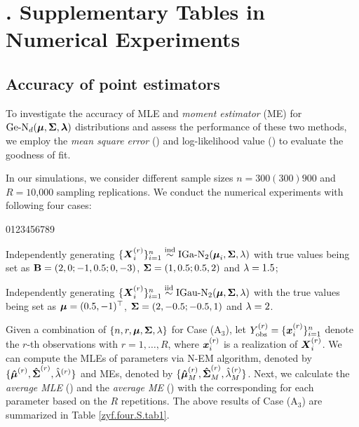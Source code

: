 \section{$\!\!\!\!\!\!\!$. Supplementary Tables in Numerical Experiments}        %

\subsection{Accuracy of point estimators}       %

To investigate the accuracy of MLE and \textit{moment estimator} (ME) for $\mbox{Ge-N}_d({\boldsymbol{\mu}}, {\mbox{\boldmath$\Sigma$}}, {\boldsymbol{\lambda}})$ distributions and assess the performance of these two methods, we employ the \textit{mean square error} () and log-likelihood value () to evaluate the goodness of fit.

In our simulations, we consider different sample sizes $n = 300(300)900$ and $R = 10$,000 sampling replications. We conduct the numerical experiments with following four cases:
\begin{namelist}{0123456789}
\item[\hspace*{-0.05cm} Case (A$_2$):] Independently generating $\{{\boldsymbol{X}}_i^{(r)}\}_{i=1}^n \stackrel{{\rm ind}}{\sim} \mbox{IGa-N}_2({\boldsymbol{\mu}}_i, {\mbox{\boldmath$\Sigma$}}, \lambda)$ with true values being set as ${\bf B} = (2, 0; -1, 0.5; 0, -3)$, ${\mbox{\boldmath$\Sigma$}} = (1, 0.5; 0.5, 2)$ and $\lambda = 1.5$;

\item[\hspace*{-0.05cm} Case (A$_3$):] Independently generating $\{{\boldsymbol{X}}_i^{(r)}\}_{i=1}^n \stackrel{{\rm iid}}{\sim} \mbox{IGau-N}_2({\boldsymbol{\mu}}, {\mbox{\boldmath$\Sigma$}}, \lambda)$ with the true values being set as ${\boldsymbol{\mu}} = (0.5, -1)^\top$, ${\mbox{\boldmath$\Sigma$}} = (2, -0.5; -0.5, 1)$ and $\lambda = 2$.
\end{namelist}

Given a combination of $\{n, r, {\boldsymbol{\mu}}, {\mbox{\boldmath$\Sigma$}}, \lambda\}$ for Case (A$_3$), let $Y_{\rm obs}^{(r)} = \{{\boldsymbol{x}}_i^{(r)}\}_{i=1}^n$ denote the $r$-th observations with $r = 1, \dots, R$, where ${\boldsymbol{x}}_i^{(r)}$ is a realization of ${\boldsymbol{X}}_i^{(r)}$. We can compute the MLEs of parameters via N-EM algorithm, denoted by $\{\boldsymbol{\hat{\mu}}^{(r)}, \boldsymbol{\hat{\Sigma}}^{(r)}, \hat{\lambda}^{(r)}\}$ and MEs, denoted by $\{\boldsymbol{\hat{\mu}}_M^{(r)}, \boldsymbol{\hat{\Sigma}}_M^{(r)}, \hat{\lambda}_M^{(r)}\}$. Next, we calculate the \textit{average MLE} () and the \textit{average ME} () with the corresponding  for each parameter based on the $R$ repetitions. The above results of Case (A$_3$) are summarized in Table \ref{zyf.four.S.tab1}.

